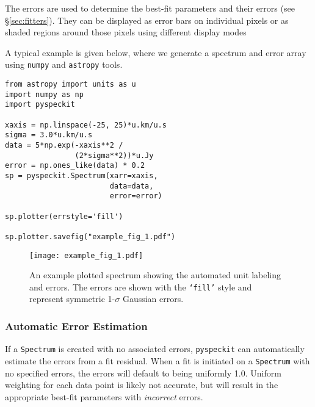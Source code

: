 \documentclass[twocolumn]{aastex62}
\newcommand{\pyspeckit}{\texttt{pyspeckit}\xspace}
\begin{document}
The errors are used to determine the best-fit parameters and their errors (see
\S \ref{sec:fitters}).  They can be displayed as error bars on individual
pixels or as shaded regions around those pixels using different display modes

A typical example is given below, where we generate a spectrum and error
array using \texttt{numpy} and \texttt{astropy} tools.

\vspace{2mm}
\begin{minipage}{\linewidth}
\begin{verbatim}
from astropy import units as u
import numpy as np
import pyspeckit

xaxis = np.linspace(-25, 25)*u.km/u.s
sigma = 3.0*u.km/u.s
data = 5*np.exp(-xaxis**2 /
                (2*sigma**2))*u.Jy
error = np.ones_like(data) * 0.2
sp = pyspeckit.Spectrum(xarr=xaxis,
                        data=data,
                        error=error)

sp.plotter(errstyle='fill')

sp.plotter.savefig("example_fig_1.pdf")
\end{verbatim}
\end{minipage}

\begin{figure*}[!htp]
\texttt{[image: example\_fig\_1.pdf]}
\caption{An example plotted spectrum showing the automated unit labeling
and errors.  The errors are shown with the \texttt{`fill'} style
and represent symmetric 1-$\sigma$ Gaussian errors.  
}
\label{fig:example1}
\end{figure*}




\subsubsection{Automatic Error Estimation}
If a \texttt{Spectrum} is created with no associated errors, \pyspeckit can
automatically estimate the errors from a fit residual. When a fit is initiated
on a \texttt{Spectrum} with no specified errors, the errors will default to
being uniformly 1.0. Uniform weighting for each data point is likely not
accurate, but will result in the appropriate best-fit parameters with
\emph{incorrect} errors.
\end{document}
